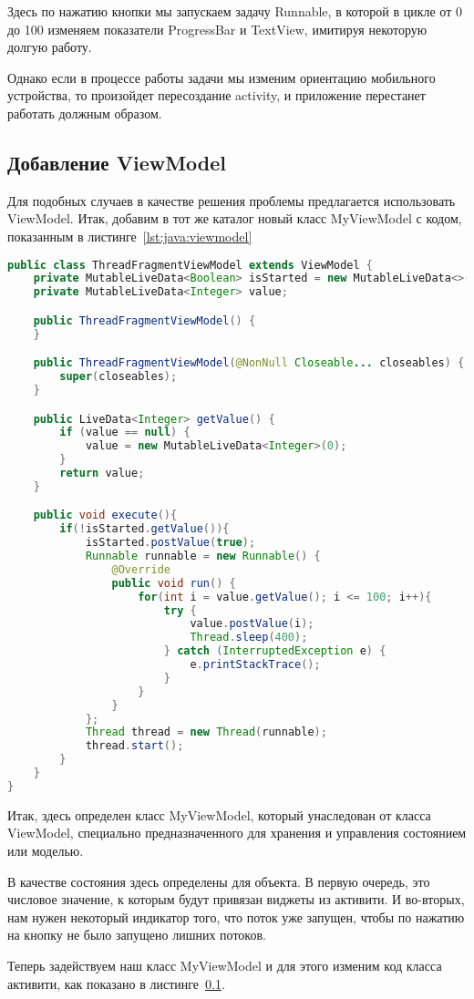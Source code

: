 Здесь по нажатию кнопки мы запускаем задачу Runnable, в которой в цикле
от 0 до 100 изменяем показатели ProgressBar и TextView, имитируя некоторую
долгую работу.\par
Однако если в процессе работы задачи мы изменим ориентацию мобильного
устройства, то произойдет пересоздание activity, и приложение перестанет
работать должным образом.

\subsection{Добавление ViewModel}
Для подобных случаев в качестве решения проблемы предлагается использовать
ViewModel. Итак, добавим в тот же каталог новый класс MyViewModel
с кодом, показанным в листинге~\ref{lst:java:viewmodel}

\begin{lstlisting}[language=Java
	, label=lst:java:viewmodel
	]
public class ThreadFragmentViewModel extends ViewModel {
	private MutableLiveData<Boolean> isStarted = new MutableLiveData<>(false);
	private MutableLiveData<Integer> value;

	public ThreadFragmentViewModel() {
	}

	public ThreadFragmentViewModel(@NonNull Closeable... closeables) {
		super(closeables);
	}

	public LiveData<Integer> getValue() {
		if (value == null) {
			value = new MutableLiveData<Integer>(0);
		}
		return value;
	}

	public void execute(){
		if(!isStarted.getValue()){
			isStarted.postValue(true);
			Runnable runnable = new Runnable() {
				@Override
				public void run() {
					for(int i = value.getValue(); i <= 100; i++){
						try {
							value.postValue(i);
							Thread.sleep(400);
						} catch (InterruptedException e) {
							e.printStackTrace();
						}
					}
				}
			};
			Thread thread = new Thread(runnable);
			thread.start();
		}
	}
}
\end{lstlisting}

Итак, здесь определен класс MyViewModel, который унаследован от класса
ViewModel, специально предназначенного для хранения и управления состоянием
или моделью.\par
В качестве состояния здесь определены для объекта.
В первую очередь, это числовое значение, к которым будут привязан виджеты
из активити. И во-вторых, нам нужен некоторый индикатор того,
что поток уже запущен, чтобы по нажатию на кнопку не было запущено лишних
потоков.\par
Теперь задействуем наш класс MyViewModel и для этого изменим код класса
активити, как показано в листинге~\ref{}.

